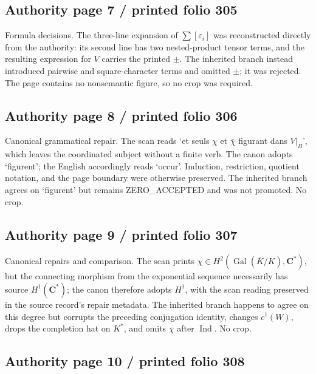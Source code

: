 \documentclass[10pt]{article}
\begin{document}
\subsection*{Authority page 7 / printed folio 305}

Formula decisions. The three-line expansion of \(\sum[\varepsilon_i]\) was reconstructed directly from the authority: its second line has two nested-product tensor terms, and the resulting expression for \(V\) carries the printed \(\pm\). The inherited branch instead introduced pairwise and square-character terms and omitted \(\pm\); it was rejected. The page contains no nonsemantic figure, so no crop was required.\par

\subsection*{Authority page 8 / printed folio 306}

Canonical grammatical repair. The scan reads ‘et seuls \(\chi\) et \(\bar\chi\) figurant dans \(V|_B\)’, which leaves the coordinated subject without a finite verb. The canon adopts ‘figurent’; the English accordingly reads ‘occur’. Induction, restriction, quotient notation, and the page boundary were otherwise preserved. The inherited branch agrees on ‘figurent’ but remains ZERO\_ACCEPTED and was not promoted. No crop.\par

\subsection*{Authority page 9 / printed folio 307}

Canonical repairs and comparison. The scan prints \(\chi\in H^2(\operatorname{Gal}(\bar K/K),\mathbf C^*)\), but the connecting morphism from the exponential sequence necessarily has source \(H^1(\mathbf C^*)\); the canon therefore adopts \(H^1\), with the scan reading preserved in the source record’s repair metadata. The inherited branch happens to agree on this degree but corrupts the preceding conjugation identity, changes \(c^1(W)\), drops the completion hat on \(K^*\), and omits \(\chi\) after \(\operatorname{Ind}\). No crop.\par

\subsection*{Authority page 10 / printed folio 308}
\end{document}
